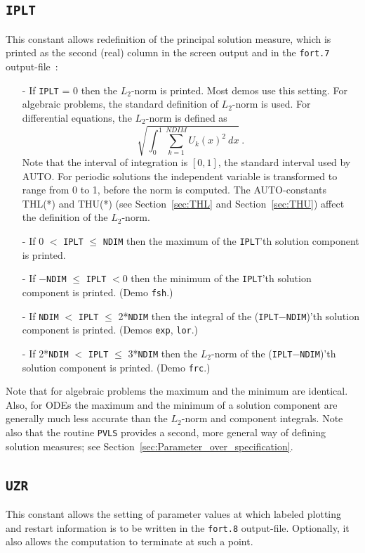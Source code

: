 \documentclass[12pt]{report}
\begin{document}
\subsection{\tt IPLT}  \label{sec:IPLT}
 This constant allows redefinition of the principal solution measure, which is
 printed as the second (real) column in the screen output and in the {\tt fort.7}
 output-file~:
 
\begin{itemize}
\item[-]
  If {\tt IPLT} = 0 then the $L_2$-norm is printed. Most demos use this setting.
  For algebraic problems, the standard definition of $L_2$-norm is used.
  For differential equations, the $L_2$-norm is defined as 
  $$ \sqrt{ \int_0^1 \sum_{k=1}^{NDIM} U_k(x)^2 ~ dx}~.$$
  Note that the interval of integration is $[0,1]$, the standard interval
 used by AUTO. For periodic solutions the independent variable is transformed
 to range from 0 to 1, before the norm is computed. The AUTO-constants THL(*) 
 and THU(*) (see Section~\ref{sec:THL} and Section~\ref{sec:THU})
 affect the definition of the $L_2$-norm.
\item[-]
  If 0 $<$ {\tt IPLT} $\le$ {\tt NDIM} then the maximum of the {\tt IPLT}'th solution component 
  is printed.
\item[-]
  If $-${\tt NDIM} $\le$ {\tt IPLT} $<$0 then the minimum of the {\tt IPLT}'th solution component
  is printed.  (Demo {\tt fsh}.)
\item[-]
  If {\tt NDIM} $<$ {\tt IPLT} $\le$ 2*{\tt NDIM} then the integral 
  of the ({\tt IPLT}$-${\tt NDIM})'th 
  solution component is printed. (Demos {\tt exp}, {\tt lor}.)
\item[-]
  If 2*{\tt NDIM} $<$ {\tt IPLT} $\le$ 3*{\tt NDIM} 
  then the $L_2$-norm of the ({\tt IPLT}$-${\tt NDIM})'th 
  solution component is printed. (Demo {\tt frc}.)
\end{itemize}

Note that for algebraic problems the maximum and the minimum are identical.
Also, for ODEs the maximum and the minimum of a solution component are generally
much less accurate than the $L_2$-norm and component integrals.
Note also that the routine {\tt PVLS} provides a second, more general way
of defining solution measures; see Section~\ref{sec:Parameter_over_specification}.


\subsection{\tt UZR} \label{sec:UZR} 
 This constant allows the setting of parameter values at which labeled plotting 
 and restart information is to be written in the {\tt fort.8} output-file.
 Optionally, it also allows the computation to terminate at such a point.
\end{document}
